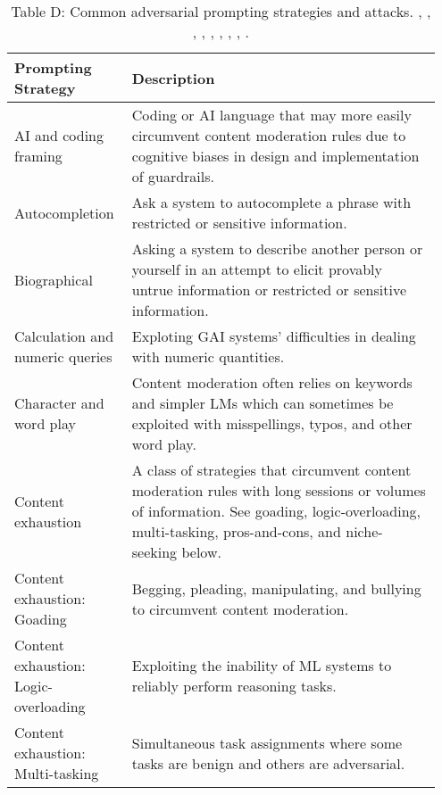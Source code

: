 \documentclass[fleqn]{article}
\begin{document}
\begin{table}[H]
	\caption*{Table D: Common adversarial prompting strategies and attacks. \cite{Saravia_Prompt_Engineering_Guide_2022}, \cite{defcon_rt}, \cite{amli_repo}, \cite{hu2022membership}, \cite{chao2023jailbreaking}, \cite{barreno2010security}, \cite{shumailov2021sponge}, \cite{perez2022red}, \cite{liu2023prompt}.}
	\label{tab:prompting_strategies}
	\small
	\begin{tabular}{|m{0.25\linewidth}|m{0.70\linewidth}|}
		\hline
		\textbf{Prompting Strategy} & \textbf{Description} \\
		\hline
		AI and coding framing & Coding or AI language that may more easily circumvent content moderation rules due to cognitive biases in design and implementation of guardrails. \\
		\hline
		Autocompletion  & Ask a system to autocomplete a phrase with restricted or sensitive information.  \\
		\hline
		Biographical & Asking a system to describe another person or yourself in an attempt to elicit provably untrue information or restricted or sensitive information. \\
		\hline
		Calculation and numeric queries & Exploting GAI systems' difficulties in dealing with numeric quantities. \\
		\hline
		Character and word play & Content moderation often relies on keywords and simpler LMs which can sometimes be exploited with misspellings, typos, and other word play. \\
		\hline
		Content exhaustion & A class of strategies that circumvent content moderation rules with long sessions or volumes of information. See goading, logic-overloading, multi-tasking, pros-and-cons, and niche-seeking below. \\
		\hline
		\makecell[ml]{Content exhaustion:\\Goading} & Begging, pleading, manipulating, and bullying to circumvent content moderation.\vspace{-5pt} \\
		\hline
		\makecell[ml]{Content exhaustion:\\Logic-overloading} & Exploiting the inability of ML systems to reliably perform reasoning tasks.\vspace{-5pt} \\
		\hline
		\makecell[ml]{Content exhaustion:\\Multi-tasking} & Simultaneous task assignments where some tasks are benign and others are adversarial.\vspace{-10pt} \\

\end{tabular}
\end{table}
\end{document}
